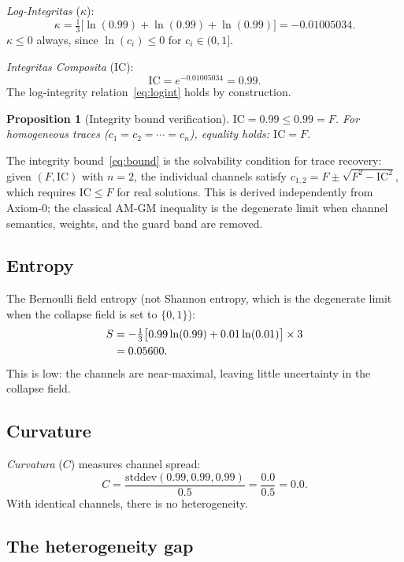 \documentclass[
  aps,
  prd,
  twocolumn,
  superscriptaddress,
  nofootinbib,
  floatfix
]{revtex4-2}
\newtheorem{proposition}[theorem]{Proposition}
\newcommand{\beq}{\begin{equation}}
\newcommand{\eeq}{\end{equation}}
\newcommand{\IC}{\mathrm{IC}}
\begin{document}
\emph{Log-Integritas} ($\kappa$):
\beq
  \kappa = \tfrac{1}{3}\bigl[\ln(0.99) + \ln(0.99) + \ln(0.99)\bigr]
  = -0.01005034.
\eeq
$\kappa \leq 0$ always, since $\ln(c_i) \leq 0$ for
$c_i \in (0, 1]$.

\emph{Integritas Composita} ($\IC$):
\beq
  \IC = e^{-0.01005034} = 0.99.
\eeq
The log-integrity relation~\eqref{eq:logint} holds by construction.

\begin{proposition}[Integrity bound verification]\label{prop:bound}
$\IC = 0.99 \leq 0.99 = F$.  For homogeneous traces
($c_1 = c_2 = \cdots = c_n$), equality holds: $\IC = F$.
\end{proposition}

The integrity bound~\eqref{eq:bound} is the solvability condition
for trace recovery: given $(F, \IC)$ with $n = 2$, the individual
channels satisfy $c_{1,2} = F \pm \sqrt{F^2 - \IC^2}$, which
requires $\IC \leq F$ for real solutions.  This is derived
independently from Axiom-0; the classical AM-GM inequality is the
degenerate limit when channel semantics, weights, and the guard band
are removed.

\subsection{Entropy}

The Bernoulli field entropy (not Shannon entropy, which is the
degenerate limit when the collapse field is set to $\{0, 1\}$):
\begin{align}
  S &= -\tfrac{1}{3}\bigl[0.99\ln(0.99) + 0.01\ln(0.01)\bigr]
       \times 3 \notag \\
    &= 0.05600. \label{eq:Sval}
\end{align}
This is low: the channels are near-maximal, leaving little
uncertainty in the collapse field.

\subsection{Curvature}

\emph{Curvatura} ($C$) measures channel spread:
\beq
  C = \frac{\mathrm{stddev}(0.99, 0.99, 0.99)}{0.5} = \frac{0.0}{0.5} = 0.0.
\eeq
With identical channels, there is no heterogeneity.

\subsection{The heterogeneity gap}
\end{document}
